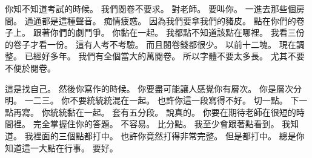 \hypertarget{c01:cue:3669}{}你知不知道考試的時候。
\hypertarget{c01:cue:3670}{}我們閱卷不要求。
\hypertarget{c01:cue:3671}{}對老師。
\hypertarget{c01:cue:3672}{}要叫你。
\hypertarget{c01:cue:3673}{}一進去那些個房間。
\hypertarget{c01:cue:3674}{}通通都是這種聲音。
\hypertarget{c01:cue:3675}{}痴情疲惑。
\hypertarget{c01:cue:3676}{}因為我們要拿我們的豬皮。
\hypertarget{c01:cue:3677}{}點在你們的卷子上。
\hypertarget{c01:cue:3678}{}跟著你們的劇鬥爭。
\hypertarget{c01:cue:3679}{}你黏在一起。
\hypertarget{c01:cue:3680}{}我都點不知道該點在哪裡。
\hypertarget{c01:cue:3681}{}我看三份的卷子才看一份。
\hypertarget{c01:cue:3682}{}這有人考不考驗。
\hypertarget{c01:cue:3683}{}而且閱卷錢都很少。
\hypertarget{c01:cue:3684}{}以前十二塊。
\hypertarget{c01:cue:3685}{}現在調整。
\hypertarget{c01:cue:3686}{}已經好多年。
\hypertarget{c01:cue:3687}{}我們有全個當大的萬閱卷。
\hypertarget{c01:cue:3688}{}所以字體不要太多長。
\hypertarget{c01:cue:3689}{}尤其不要不便於閱卷。

\hypertarget{c01:cue:3690}{}這是找自己。
\hypertarget{c01:cue:3691}{}然後你寫作的時候。
\hypertarget{c01:cue:3692}{}你要盡可能讓人感覺你有層次。
\hypertarget{c01:cue:3693}{}你是層次分明。
\hypertarget{c01:cue:3694}{}一二三。
\hypertarget{c01:cue:3695}{}你不要統統統混在一起。
\hypertarget{c01:cue:3696}{}也許你這一段寫得不好。
\hypertarget{c01:cue:3697}{}切一點。
\hypertarget{c01:cue:3698}{}下一點再寫。
\hypertarget{c01:cue:3699}{}你統統黏在一起。
\hypertarget{c01:cue:3700}{}套有五分段。
\hypertarget{c01:cue:3701}{}說真的。
\hypertarget{c01:cue:3702}{}你要在期待老師在很短的時間裡。
\hypertarget{c01:cue:3703}{}完全掌握住你的答題。
\hypertarget{c01:cue:3704}{}不容易。
\hypertarget{c01:cue:3705}{}比分點。
\hypertarget{c01:cue:3706}{}我至少會跟著點看到。
\hypertarget{c01:cue:3707}{}我知道。
\hypertarget{c01:cue:3708}{}我裡面的三個點都打中。
\hypertarget{c01:cue:3709}{}也許你竟然打得非常完整。
\hypertarget{c01:cue:3710}{}但是都打中。
\hypertarget{c01:cue:3711}{}總是你知道這一大點在行事。
\hypertarget{c01:cue:3712}{}要好。

